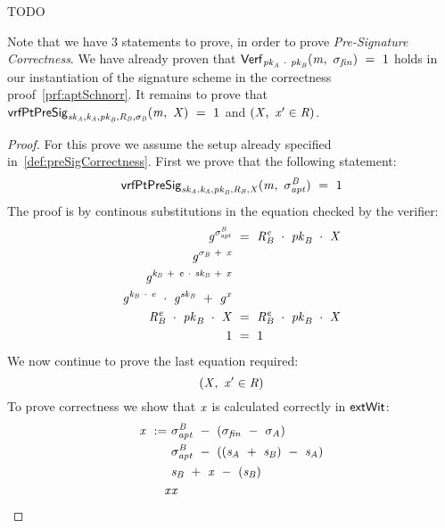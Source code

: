 \begin{definition}
    TODO~\cite{aumayr2020bitcoinchannels}
\end{definition}

Note that we have 3 statements to prove, in order to prove \textit{Pre-Signature Correctness}.
We have already proven that $\mathsf{Verf}_{\mathit{pk}_{\mathit{A}} ~\cdot~ \mathit{pk}_{\mathit{B}}}(\mathit{m} ,~ \sigma_{\mathit{fin}}) ~=~ 1$ holds in our instantiation of the signature scheme in the
correctness proof~\ref{prf:aptSchnorr}.
It remains to prove that $\mathsf{vrfPtPreSig}_{\mathit{sk}_{\mathit{A}},\mathit{\mathit{k}_{\mathit{A}}},\mathit{pk}_{\mathit{B}},\mathit{R}_{\mathit{B}},\sigma_{\mathit{B}}}(\mathit{m} ,~ \mathit{X}) ~=~ 1$ and
$(\mathit{X} ,~ \mathit{x}' \in \mathit{R})$.

\begin{proof}
    \label{prf:aptSchnorrPreSigCorr}
    For this prove we assume the setup already specified in~\ref{def:preSigCorrectness}.
    First we prove that the following statement:
    \[
        \mathsf{vrfPtPreSig}_{\mathit{sk}_{\mathit{A}},\mathit{\mathit{k}_{\mathit{A}}},\mathit{pk}_{\mathit{B}},\mathit{R}_{\mathit{B}},\mathit{X}}(\mathit{m} ,~ \sigma^{\mathit{B}}_{\mathit{apt}}) ~=~ 1
    \]
    The proof is by continous substitutions in the equation checked by the verifier:
    \begin{align}
        \mathit{g}^{\sigma^{\mathit{B}}_{\mathit{apt}}} &~=~ \mathit{R}_{\mathit{B}}^{\mathit{e}} ~\cdot~ \mathit{pk}_{\mathit{B}} ~\cdot~ \mathit{X} \\
        \mathit{g}^{\sigma_{\mathit{B}} ~+~ \mathit{x}} & \\
        \mathit{g}^{\mathit{\mathit{k}_{\mathit{B}}} ~+~ \mathit{e} ~\cdot~ \mathit{sk}_{\mathit{B}} ~+~ \mathit{x}} & \\
        \mathit{g}^{\mathit{\mathit{k}_{\mathit{B}}} ~\cdot~ \mathit{e}} ~\cdot~ \mathit{g}^{\mathit{sk}_{\mathit{B}}} ~+~ \mathit{g}^{\mathit{x}} & \\
        \mathit{R}_{\mathit{B}}^{\mathit{e}} ~\cdot~ \mathit{pk}_{\mathit{B}} ~\cdot~ \mathit{X} &~=~ \mathit{R}_{\mathit{B}}^{\mathit{e}} ~\cdot~ \mathit{pk}_{\mathit{B}} ~\cdot~ \mathit{X} \\
        1 &~=~ 1
    \end{align}
    We now continue to prove the last equation required:
    \[
        (\mathit{X} ,~ \mathit{x}' \in \mathit{R})
    \]
    To prove correctness we show that $\mathit{x}$ is calculated correctly in $\mathsf{extWit}$:
    \begin{align}
        \mathit{x} ~:=~ & \sigma^{\mathit{B}}_{\mathit{apt}} ~-~ (\sigma_{\mathit{fin}} ~-~ \sigma_{\mathit{A}}) \\
        & \sigma^{\mathit{B}}_{\mathit{apt}} ~-~ ((\mathit{s}_{\mathit{A}} ~+~ \mathit{s}_{\mathit{B}} ) ~-~ \mathit{s}_{\mathit{A}} ) \\
        & \mathit{s}_{\mathit{B}} ~+~ \mathit{x} ~-~ (\mathit{s}_{\mathit{B}}) \\
        \mathit{x} & \mathit{x} \\
    \end{align}

\end{proof}